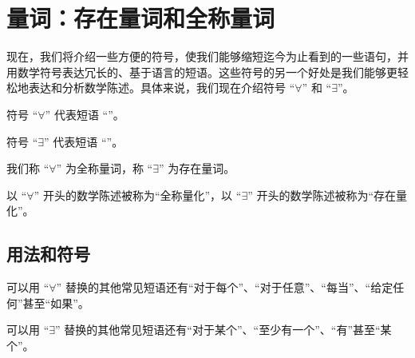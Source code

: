 \section{量词：存在量词和全称量词}

现在，我们将介绍一些方便的符号，使我们能够缩短迄今为止看到的一些语句，并用数学符号表达冗长的、基于语言的短语。这些符号的另一个好处是我们能够更轻松地表达和分析数学陈述。具体来说，我们现在介绍符号 ``$\forall$'' 和 ``$\exists$''。

\begin{definition}
    符号 ``$\forall$'' 代表短语 ``''。

    符号 ``$\exists$'' 代表短语 ``''。

    我们称 ``$\forall$'' 为全称量词，称 ``$\exists$'' 为存在量词。

    以 ``$\forall$'' 开头的数学陈述被称为``全称量化''，以 ``$\exists$'' 开头的数学陈述被称为``存在量化''。
\end{definition}

\subsection{用法和符号}

可以用 ``$\forall$'' 替换的其他常见短语还有``对于每个''、``对于任意''、``每当''、``给定任何''甚至``如果''。

可以用 ``$\exists$'' 替换的其他常见短语还有``对于某个''、``至少有一个''、``有''甚至``某个''。

